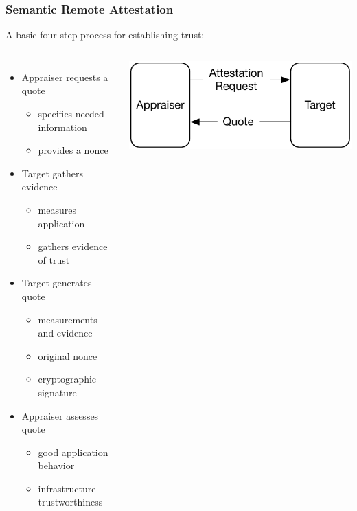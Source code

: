 \documentclass{beamer}
\begin{document}
\begin{frame}
  \frametitle{Semantic Remote Attestation}

  A basic four step process for establishing trust:

  \begin{columns}[c]
    \begin{itemize}
    \item Appraiser requests a quote
      \begin{itemize}
      \item specifies needed information
      \item provides a nonce
      \end{itemize}
    \item Target gathers evidence
      \begin{itemize}
      \item measures application
      \item gathers evidence of trust
      \end{itemize}
    \item Target generates quote
      \begin{itemize}
      \item measurements and evidence
      \item original nonce
      \item cryptographic signature
      \end{itemize}
    \item Appraiser assesses quote
      \begin{itemize}
      \item good application behavior
      \item infrastructure trustworthiness
      \end{itemize}
    \end{itemize}
    \begin{center}
      \includegraphics[width=.95\textwidth]{figures/remote-att.pdf}
    \end{center}
  \end{columns}
\end{frame}
\end{document}
